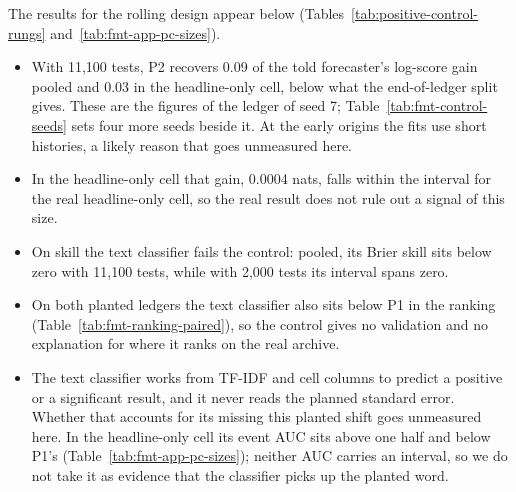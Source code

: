 The results for the rolling design appear below (Tables~\ref{tab:positive-control-rungs} and~\ref{tab:fmt-app-pc-sizes}).
\begin{itemize}
\item With 11,100 tests, P2 recovers 0.09 of the told forecaster's log-score gain pooled and 0.03 in the headline-only cell, below what the end-of-ledger split gives. These are the figures of the ledger of seed 7; Table~\ref{tab:fmt-control-seeds} sets four more seeds beside it. At the early origins the fits use short histories, a likely reason that goes unmeasured here.
\item In the headline-only cell that gain, 0.0004 nats, falls within the interval for the real headline-only cell, so the real result does not rule out a signal of this size.
\item On skill the text classifier fails the control: pooled, its Brier skill sits below zero with 11,100 tests, while with 2,000 tests its interval spans zero.
\item On both planted ledgers the text classifier also sits below P1 in the ranking (Table~\ref{tab:fmt-ranking-paired}), so the control gives no validation and no explanation for where it ranks on the real archive.
\item The text classifier works from TF-IDF and cell columns to predict a positive or a significant result, and it never reads the planned standard error. Whether that accounts for its missing this planted shift goes unmeasured here. In the headline-only cell its event AUC sits above one half and below P1's (Table~\ref{tab:fmt-app-pc-sizes}); neither AUC carries an interval, so we do not take it as evidence that the classifier picks up the planted word.

\end{itemize}
